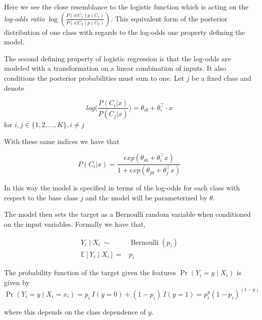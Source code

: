 Here we see the close resemblance to the logistic function which is acting on the \textit{log-odds ratio} $ \log( \frac{ P(x|C_1)p(C_1)}{P(x|C_2)p(C_2) })$. This equivalent form of the posterior distribution of one class with regards to the log-odds one property defining the model.



The second defining property of logistic regression is that the log-odds are modeled with a transformation on a linear combination of inputs. It also conditions the posterior probabilities must sum to one. Let $j$ be a fixed class and denote

\begin{equation}\label{logit-logOddss}
 log\big( \frac{P(C_i|x)}{P(C_j|x)}\big) = \theta_{i0} + \theta_i^\intercal \cdot x 
 \end{equation}  for $i,j \in \{1,2,...,K\}, i\neq j$

With these same indices we have that

\begin{equation} P(C_i|x) = \frac{ exp(\theta_{i0} + \theta_i^\intercal x)}{1 + exp(\theta_{j0} + \theta_j^\intercal x)} 
\end{equation}

In this way the model is specified in terms of the log-odds for each class with respect to the base class $j$ and the model will be parameterized by $\theta$.

The model then sets the target as a Bernoulli random variable when conditioned on the input variables. Formally we have that,

\begin{equation}
\begin{split}
Y_i \mid X_i \ \sim & \operatorname{Bernoulli}(p_i) \\
\mathbb{E}[Y_i \mid X_i ] = & p_i
\end{split}
\end{equation}


The probability function of the target given the features $\Pr(Y_i=y\mid X_i)$ is given by
\begin{equation}\label{logit-probabilityDensity}
\Pr(Y_i=y \mid X_i = x_i) = p_i \ I(y=0) + (1-p_i) \ I(y=1) = p_i^{y} (1-p_i)^{(1-y)}
\end{equation}

where this depends on the class dependence of $y$.

